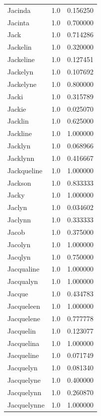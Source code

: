 \documentclass[
  letterpaper,
  DIV=11,
  numbers=noendperiod]{scrreprt}
\begin{document}
\begin{tabular}{lrr}
Jacinda         &   1.0 &   0.156250 \\
Jacinta         &   1.0 &   0.700000 \\
Jack            &   1.0 &   0.714286 \\
Jackelin        &   1.0 &   0.320000 \\
Jackeline       &   1.0 &   0.127451 \\
Jackelyn        &   1.0 &   0.107692 \\
Jackelyne       &   1.0 &   0.800000 \\
Jacki           &   1.0 &   0.315789 \\
Jackie          &   1.0 &   0.025070 \\
Jacklin         &   1.0 &   0.625000 \\
Jackline        &   1.0 &   1.000000 \\
Jacklyn         &   1.0 &   0.068966 \\
Jacklynn        &   1.0 &   0.416667 \\
Jackqueline     &   1.0 &   1.000000 \\
Jackson         &   1.0 &   0.833333 \\
Jacky           &   1.0 &   1.000000 \\
Jaclyn          &   1.0 &   0.034602 \\
Jaclynn         &   1.0 &   0.333333 \\
Jacob           &   1.0 &   0.375000 \\
Jacolyn         &   1.0 &   1.000000 \\
Jacqlyn         &   1.0 &   0.750000 \\
Jacqualine      &   1.0 &   1.000000 \\
Jacqualyn       &   1.0 &   1.000000 \\
Jacque          &   1.0 &   0.434783 \\
Jacqueleen      &   1.0 &   1.000000 \\
Jacquelene      &   1.0 &   0.777778 \\
Jacquelin       &   1.0 &   0.123077 \\
Jacquelina      &   1.0 &   1.000000 \\
Jacqueline      &   1.0 &   0.071749 \\
Jacquelyn       &   1.0 &   0.081340 \\
Jacquelyne      &   1.0 &   0.400000 \\
Jacquelynn      &   1.0 &   0.260870 \\
Jacquelynne     &   1.0 &   1.000000 \\

\end{tabular}
\end{document}
